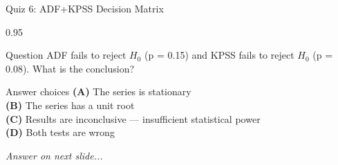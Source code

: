 \documentclass[9pt, aspectratio=169, t]{beamer}
\begin{document}
\begin{frame}{Quiz 6: ADF+KPSS Decision Matrix}
    \begin{cminipage}{0.95\textwidth}
    \begin{alertblock}{Question}
        ADF fails to reject $H_0$ (p = 0.15) and KPSS fails to reject $H_0$ (p = 0.08). What is the conclusion?
    \end{alertblock}

    \vspace{0.4cm}

    \begin{block}{Answer choices}
        \textcolor{MainBlue}{\textbf{(A)}} The series is stationary\\[3pt]
        \textcolor{MainBlue}{\textbf{(B)}} The series has a unit root\\[3pt]
        \textcolor{MainBlue}{\textbf{(C)}} Results are inconclusive --- insufficient statistical power\\[3pt]
        \textcolor{MainBlue}{\textbf{(D)}} Both tests are wrong
    \end{block}

    \vspace{0.5cm}

    \begin{center}
        \textit{Answer on next slide...}
    \end{center}
    \end{cminipage}
\end{frame}
\end{document}
